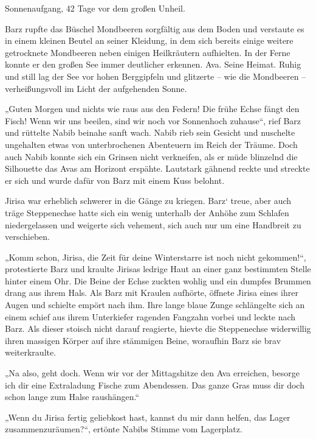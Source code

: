 


Sonnenaufgang, 42 Tage vor dem großen Unheil.\bigskip



Barz rupfte das Büschel Mondbeeren sorgfältig aus dem Boden und verstaute es in einem kleinen Beutel an seiner Kleidung, in dem sich bereits einige weitere getrocknete Mondbeeren neben einigen Heilkräutern aufhielten. In der Ferne konnte er den großen See immer deutlicher erkennen. Ava. Seine Heimat. Ruhig und still lag der See vor hohen Berggipfeln und glitzerte – wie die Mondbeeren – verheißungsvoll im Licht der aufgehenden Sonne.

„Guten Morgen und nichts wie raus aus den Federn! Die frühe Echse fängt den Fisch! Wenn wir uns beeilen, sind wir noch vor Sonnenhoch zuhause“, rief Barz und rüttelte Nabib beinahe sanft wach. Nabib rieb sein Gesicht und nuschelte ungehalten etwas von unterbrochenen Abenteuern im Reich der Träume. Doch auch Nabib konnte sich ein Grinsen nicht verkneifen, als er müde blinzelnd die Silhouette das Avas am Horizont erspähte. Lautstark gähnend reckte und streckte er sich und wurde dafür von Barz mit einem Kuss belohnt.

Jirisa war erheblich schwerer in die Gänge zu kriegen. Barz‘ treue, aber auch träge Steppenechse hatte sich ein wenig unterhalb der Anhöhe zum Schlafen niedergelassen und weigerte sich vehement, sich auch nur um eine Handbreit zu verschieben.

„Komm schon, Jirisa, die Zeit für deine Winterstarre ist noch nicht gekommen!“, protestierte Barz und kraulte Jirisas ledrige Haut an einer ganz bestimmten Stelle hinter einem Ohr. Die Beine der Echse zuckten wohlig und ein dumpfes Brummen drang aus ihrem Hals. Als Barz mit Kraulen aufhörte, öffnete Jirisa eines ihrer Augen und schielte empört nach ihm. Ihre lange blaue Zunge schlängelte sich an einem schief aus ihrem Unterkiefer ragenden Fangzahn vorbei und leckte nach Barz. Als dieser stoisch nicht darauf reagierte, hievte die Steppenechse widerwillig ihren massigen Körper auf ihre stämmigen Beine, woraufhin Barz sie brav weiterkraulte.

„Na also, geht doch. Wenn wir vor der Mittagshitze den Ava erreichen, besorge ich dir eine Extraladung Fische zum Abendessen. Das ganze Gras muss dir doch schon lange zum Halse raushängen.“

„Wenn du Jirisa fertig geliebkost hast, kannst du mir dann helfen, das Lager zusammenzuräumen?“, ertönte Nabibs Stimme vom Lagerplatz.

